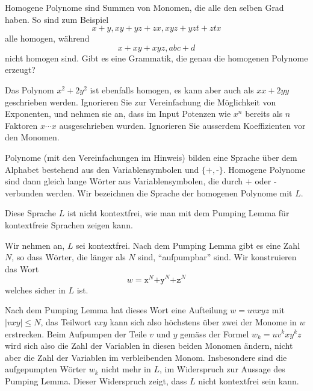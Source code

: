 Homogene Polynome sind Summen von Monomen, die alle den selben Grad haben.
So sind zum Beispiel 
\[
x+y, xy+yz+zx, xyz+yzt+ztx
\]
alle homogen, während
\[
x+xy+xyz, abc+d
\]
nicht homogen sind. Gibt es eine Grammatik, die genau die homogenen Polynome
erzeugt?


\begin{hinweis}
Das Polynom $x^2+2y^2$ ist ebenfalls homogen, es kann aber auch als $xx+2yy$
geschrieben werden. 
Ignorieren Sie zur Vereinfachung die Möglichkeit von Exponenten,
und nehmen sie an, dass im Input Potenzen wie $x^n$ bereits als
$n$ Faktoren $x\cdots x$ ausgeschrieben wurden.
Ignorieren Sie ausserdem Koeffizienten vor den Monomen.
\end{hinweis}

\begin{loesung}
Polynome (mit den Vereinfachungen im Hinweis) bilden eine Sprache
über dem Alphabet bestehend aus
den Variablensymbolen und $\{\texttt{+},\texttt{-}\}$.
Homogene Polynome sind
dann gleich lange Wörter aus Variablensymbolen, die durch
$\texttt{+}$ oder $\texttt{-}$ verbunden werden. Wir bezeichnen die
Sprache der homogenen Polynome mit $L$.

Diese Sprache $L$ ist nicht kontextfrei, wie man mit dem Pumping Lemma
für kontextfreie Sprachen zeigen kann.

Wir nehmen an, $L$ sei kontextfrei. Nach dem Pumping Lemma
gibt es eine Zahl $N$, so dass Wörter, die länger als $N$ sind,
``aufpumpbar'' sind. Wir konstruieren das Wort
\[
w=\texttt{x}^N\texttt{+y}^N\texttt{+z}^N
\]
welches sicher in $L$ ist.

Nach dem Pumping Lemma hat dieses Wort eine Aufteilung
$w=uvxyz$ mit $|vxy|\le N$, das Teilwort $vxy$ kann sich also 
höchstens über zwei der Monome in $w$ erstrecken.
Beim Aufpumpen der Teile $v$ und $y$ gemäss der Formel
$w_k=uv^kxy^kz$ wird sich also die Zahl der Variablen in diesen
beiden Monomen ändern, nicht aber die Zahl der Variablen im 
verbleibenden Monom. Insbesondere sind die aufgepumpten Wörter $w_k$
nicht mehr in $L$, im Widerspruch zur Aussage des Pumping Lemma.
Dieser Widerspruch zeigt, dass $L$ nicht kontextfrei sein kann.
\end{loesung}

